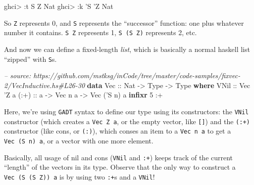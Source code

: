 \documentclass[]{article}
\newenvironment{Shaded}{}{}
\newcommand{\KeywordTok}[1]{\textcolor[rgb]{0.00,0.44,0.13}{\textbf{#1}}}
\newcommand{\DataTypeTok}[1]{\textcolor[rgb]{0.56,0.13,0.00}{#1}}
\newcommand{\DecValTok}[1]{\textcolor[rgb]{0.25,0.63,0.44}{#1}}
\newcommand{\CharTok}[1]{\textcolor[rgb]{0.25,0.44,0.63}{#1}}
\newcommand{\CommentTok}[1]{\textcolor[rgb]{0.38,0.63,0.69}{\textit{#1}}}
\newcommand{\OtherTok}[1]{\textcolor[rgb]{0.00,0.44,0.13}{#1}}
\newcommand{\FunctionTok}[1]{\textcolor[rgb]{0.02,0.16,0.49}{#1}}
\newcommand{\NormalTok}[1]{#1}
\begin{document}
\begin{Shaded}
\begin{Highlighting}[]
\NormalTok{ghci}\FunctionTok{>} \FunctionTok{:}\NormalTok{t }\DataTypeTok{S} \DataTypeTok{Z}
\DataTypeTok{Nat}
\NormalTok{ghci}\FunctionTok{>} \FunctionTok{:}\NormalTok{k }\CharTok{'S '}\DataTypeTok{Z}
\DataTypeTok{Nat}
\end{Highlighting}
\end{Shaded}

So \texttt{\textquotesingle{}Z} represents 0, and \texttt{\textquotesingle{}S}
represents the ``successor'' function: one plus whatever number it contains.
\texttt{\textquotesingle{}S\ \textquotesingle{}Z} represents 1,
\texttt{\textquotesingle{}S\ (\textquotesingle{}S\ \textquotesingle{}Z)}
represents 2, etc.

And now we can define a fixed-length \emph{list}, which is basically a normal
haskell list ``zipped'' with \texttt{S}s.

\begin{Shaded}
\begin{Highlighting}[]
\CommentTok{-- source: https://github.com/mstksg/inCode/tree/master/code-samples/fixvec-2/VecInductive.hs#L26-30}
\KeywordTok{data} \DataTypeTok{Vec}\OtherTok{ ::} \DataTypeTok{Nat} \OtherTok{->} \DataTypeTok{Type} \OtherTok{->} \DataTypeTok{Type} \KeywordTok{where}
    \DataTypeTok{VNil}\OtherTok{ ::} \DataTypeTok{Vec} \CharTok{'Z a}
\OtherTok{    (:+) ::}\NormalTok{ a }\OtherTok{->} \DataTypeTok{Vec}\NormalTok{ n a }\OtherTok{->} \DataTypeTok{Vec}\NormalTok{ (}\CharTok{'S n) a}
\KeywordTok{infixr} \DecValTok{5} \FunctionTok{:+}
\end{Highlighting}
\end{Shaded}

Here, we're using \texttt{GADT} syntax to define our type using its
constructors: the \texttt{VNil} constructor (which creates a
\texttt{Vec\ \textquotesingle{}Z\ a}, or the empty vector, like \texttt{{[}{]}})
and the \texttt{(:+)} constructor (like cons, or \texttt{(:)}), which conses an
item to a \texttt{Vec\ n\ a} to get a \texttt{Vec\ (\textquotesingle{}S\ n)\ a},
or a vector with one more element.

Basically, all usage of nil and cons (\texttt{VNil} and \texttt{:+}) keeps track
of the current ``length'' of the vectors in its type. Observe that the only way
to construct a
\texttt{Vec\ (\textquotesingle{}S\ (\textquotesingle{}S\ \textquotesingle{}Z))\ a}
is by using two \texttt{:+}s and a \texttt{VNil}!
\end{document}
